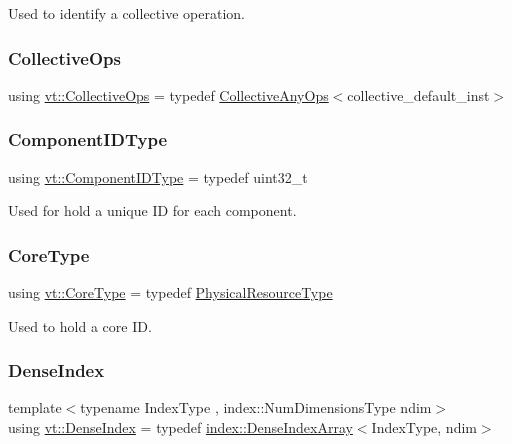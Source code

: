 Used to identify a collective operation. 

\mbox{\label{namespacevt_a776b30f114cff62549e798fedeb6222b}} 
\subsubsection{\texorpdfstring{Collective\+Ops}{CollectiveOps}}
{\footnotesize\ttfamily using \hyperlink{namespacevt_a776b30f114cff62549e798fedeb6222b}{vt\+::\+Collective\+Ops} = typedef \hyperlink{structvt_1_1_collective_any_ops}{Collective\+Any\+Ops}$<$collective\+\_\+default\+\_\+inst$>$}

\mbox{\label{namespacevt_ab6ac935c168b809c422d5121da4f2700}} 
\subsubsection{\texorpdfstring{Component\+I\+D\+Type}{ComponentIDType}}
{\footnotesize\ttfamily using \hyperlink{namespacevt_ab6ac935c168b809c422d5121da4f2700}{vt\+::\+Component\+I\+D\+Type} = typedef uint32\+\_\+t}



Used for hold a unique ID for each component. 

\mbox{\label{namespacevt_a74b11b22c02feaabab8591acc87c7c52}} 
\subsubsection{\texorpdfstring{Core\+Type}{CoreType}}
{\footnotesize\ttfamily using \hyperlink{namespacevt_a74b11b22c02feaabab8591acc87c7c52}{vt\+::\+Core\+Type} = typedef \hyperlink{namespacevt_a2dc36fcada816dc6d11774d650328ee9}{Physical\+Resource\+Type}}



Used to hold a core ID. 

\mbox{\label{namespacevt_ac016d9c31465ce11c14eab2be11f9183}} 
\subsubsection{\texorpdfstring{Dense\+Index}{DenseIndex}}
{\footnotesize\ttfamily template$<$typename Index\+Type , index\+::\+Num\+Dimensions\+Type ndim$>$ \\
using \hyperlink{namespacevt_ac016d9c31465ce11c14eab2be11f9183}{vt\+::\+Dense\+Index} = typedef \hyperlink{structvt_1_1index_1_1_dense_index_array}{index\+::\+Dense\+Index\+Array}$<$Index\+Type, ndim$>$}

